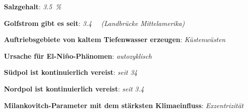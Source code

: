 \begin{wichtig}
    \item
    \textbf{Salzgehalt}:
    \emph{\SI[math-rm=\mathit,text-rm=\itshape]{3.5}{\percent}}
    
    \item
    \textbf{Golfstrom gibt es seit}:
    \emph{\SI[math-rm=\mathit,text-rm=\itshape]{3.4}{\mega\year} (Landbrücke Mittelamerika)}
    
    \item
    \textbf{Auftriebsgebiete von kaltem Tiefenwasser erzeugen}:
    \emph{Küstenwüsten}
    
    \item
    \textbf{Ursache für El-Niño-Phänomen}:
    \emph{autozyklisch}
    
    \item
    \textbf{Südpol ist kontinuierlich vereist}:
    \emph{seit \SI[math-rm=\mathit,text-rm=\itshape]{34}{\mega\year}}
    
    \item
    \textbf{Nordpol ist kontinuierlich vereist}:
    \emph{seit \SI[math-rm=\mathit,text-rm=\itshape]{3.4}{\mega\year}}
    
    \item
    \textbf{Milankovitch-Parameter mit dem stärksten Klimaeinfluss}:
    \emph{Exzentrizität}
\end{wichtig}

\pagebreak
